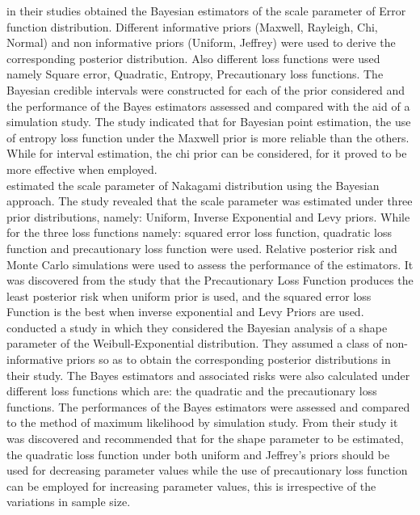 \documentclass[a4paper,12pt]{report}
\newcommand{\para}{\hspace{0.5cm}}
\begin{document}
\noindent\para  \cite{feroze2012note} in their studies obtained the Bayesian estimators of the scale parameter of Error function distribution. Different informative priors (Maxwell, Rayleigh, Chi, Normal) and non informative priors (Uniform, Jeffrey) were used to derive the corresponding posterior distribution. Also different loss functions were used namely Square error, Quadratic, Entropy, Precautionary loss functions. The Bayesian credible intervals were constructed for each of the prior considered and the performance of the Bayes estimators assessed and compared with the aid of a simulation study. The study indicated that for Bayesian point estimation, the use of entropy loss function under the Maxwell prior is more reliable than the others. While for interval estimation, the chi prior can be considered, for it proved to be more effective when employed.\\

\noindent\para \cite{zaka2014bayesian} estimated the scale parameter of Nakagami distribution using the Bayesian approach. The study revealed that the scale parameter was estimated under three prior distributions, namely: Uniform, Inverse Exponential and Levy priors. While for the three loss functions namely: squared error loss function, quadratic loss function and precautionary loss function were used. Relative posterior risk and Monte Carlo simulations were used to assess the performance of the estimators. It was discovered from the study that the Precautionary Loss Function produces the least posterior risk when uniform prior is used, and the squared error loss Function is the best when inverse exponential and Levy Priors are used.\\

\noindent\para \cite{ieren2018comparison} conducted a study in which they considered the Bayesian analysis of a shape parameter of the Weibull-Exponential distribution. They assumed a class of non-informative priors so as to obtain the corresponding posterior distributions in their study. The Bayes estimators and associated risks were also calculated under different loss functions which are: the quadratic and the precautionary loss functions. The performances of the Bayes estimators were assessed and compared to the method of maximum likelihood by simulation study. From their study it was discovered and recommended that for the shape parameter to be estimated, the quadratic loss function under both uniform and Jeffrey’s priors should be used for decreasing parameter values while the use of precautionary loss function can be employed for increasing parameter values, this is irrespective of the variations in sample size.\\
\end{document}
